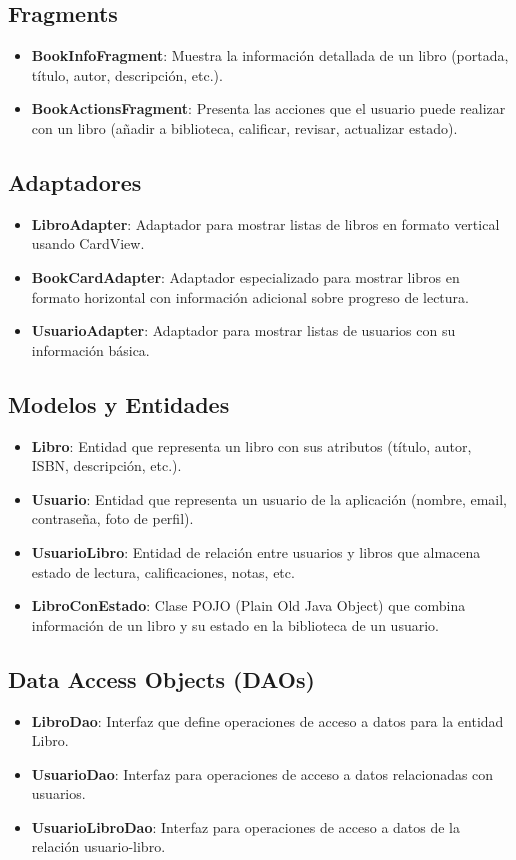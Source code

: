 \documentclass[a4paper,12pt]{report}
\begin{document}
      \subsection{Fragments}
      \begin{itemize}
        \item \textbf{BookInfoFragment}: Muestra la información detallada de un libro (portada, título, autor, descripción, etc.).
        \item \textbf{BookActionsFragment}: Presenta las acciones que el usuario puede realizar con un libro (añadir a biblioteca, calificar, revisar, actualizar estado).
      \end{itemize}
      \subsection{Adaptadores}
      \begin{itemize}
        \item \textbf{LibroAdapter}: Adaptador para mostrar listas de libros en formato vertical usando CardView.
        \item \textbf{BookCardAdapter}: Adaptador especializado para mostrar libros en formato horizontal con información adicional sobre progreso de lectura.
        \item \textbf{UsuarioAdapter}: Adaptador para mostrar listas de usuarios con su información básica.
      \end{itemize}
      \subsection{Modelos y Entidades}
      \begin{itemize}
        \item \textbf{Libro}: Entidad que representa un libro con sus atributos (título, autor, ISBN, descripción, etc.).
        \item \textbf{Usuario}: Entidad que representa un usuario de la aplicación (nombre, email, contraseña, foto de perfil).
        \item \textbf{UsuarioLibro}: Entidad de relación entre usuarios y libros que almacena estado de lectura, calificaciones, notas, etc.
        \item \textbf{LibroConEstado}: Clase POJO (Plain Old Java Object) que combina información de un libro y su estado en la biblioteca de un usuario.
      \end{itemize}
      \subsection{Data Access Objects (DAOs)}
      \begin{itemize}
        \item \textbf{LibroDao}: Interfaz que define operaciones de acceso a datos para la entidad Libro.
        \item \textbf{UsuarioDao}: Interfaz para operaciones de acceso a datos relacionadas con usuarios.
        \item \textbf{UsuarioLibroDao}: Interfaz para operaciones de acceso a datos de la relación usuario-libro.
      \end{itemize}
\end{document}
